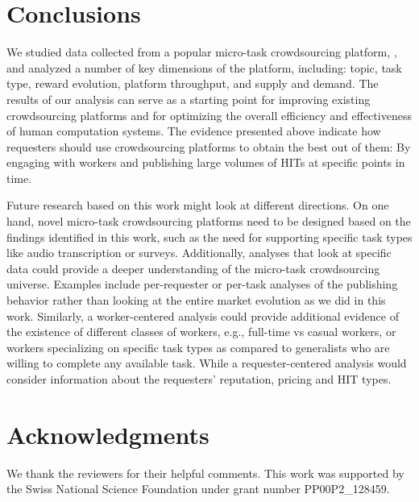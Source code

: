 \section{Conclusions}\label{sec:conc}
We studied data collected from a popular micro-task crowdsourcing platform, \amt{},
and analyzed a number of key dimensions of the platform, including: topic, task type, reward evolution, platform throughput, and supply and demand. The results of our analysis can serve as a starting point for improving existing crowdsourcing platforms and for optimizing the overall efficiency and effectiveness of human computation systems. The evidence presented above indicate how requesters should use crowdsourcing platforms to obtain the best out of them: By engaging with workers and publishing large volumes of HITs at specific points in time.

Future research based on this work might look at different directions. On one hand, novel micro-task crowdsourcing platforms need to be designed based on the findings identified in this work, such as the need for supporting specific task types like audio transcription or surveys. 
Additionally, analyses that look at specific data could provide a deeper understanding of the micro-task crowdsourcing universe. Examples include per-requester or per-task analyses of the publishing behavior rather than looking at the entire market evolution as we did in this work.
Similarly, a worker-centered analysis could provide additional evidence of the existence of different classes of workers, e.g., full-time vs casual workers, or workers specializing on specific task types as compared to generalists who are willing to complete any available task.
While a requester-centered analysis would consider information about the requesters' reputation, pricing and HIT types.

\section{Acknowledgments}
We thank the reviewers for their helpful comments.
%
This work was supported by the Swiss National Science Foundation under grant number PP00P2\_128459.